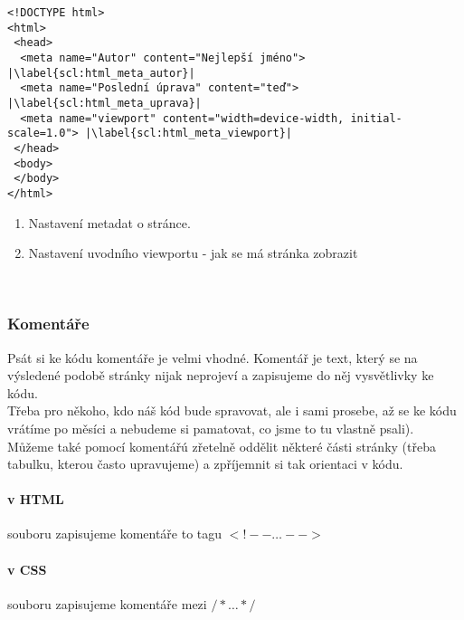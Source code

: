 \begin{minipage}[t]{.45\textwidth}
\begin{code}
\begin{verbatim}
<!DOCTYPE html> 
<html> 
 <head> 
  <meta name="Autor" content="Nejlepší jméno"> |\label{scl:html_meta_autor}|
  <meta name="Poslední úprava" content="teď"> |\label{scl:html_meta_uprava}|
  <meta name="viewport" content="width=device-width, initial-scale=1.0"> |\label{scl:html_meta_viewport}|
 </head>
 <body>
 </body> 
</html>  
\end{verbatim}

\label{code:html_meta}
\end{code}
\end{minipage}
\begin{minipage}[t]{.45\textwidth}
\begin{enumerate}
\item[ř. \ref{scl:html_meta_autor}, \ref{scl:html_meta_uprava}:] Nastavení metadat o stránce.
\item[ř. \ref{scl:html_meta_viewport}:] Nastavení uvodního viewportu - jak se má stránka zobrazit

\end{enumerate}
\end{minipage}\\


\subsubsection{Komentáře}
Psát si ke kódu komentáře je velmi vhodné. Komentář je text, který se na výsledené podobě stránky nijak neprojeví a zapisujeme do něj vysvětlivky ke kódu.\\
Třeba pro někoho, kdo náš kód bude spravovat, ale i sami prosebe, až se ke kódu vrátíme po měsíci a nebudeme si pamatovat, co jsme to tu vlastně psali). Můžeme také pomocí komentářú zřetelně oddělit některé části stránky (třeba tabulku, kterou často upravujeme) a zpříjemnit si tak orientaci v kódu.\\
\paragraph{v HTML} souboru zapisujeme komentáře to tagu $ <!-- \dots --> $
\paragraph{v CSS} souboru zapisujeme komentáře mezi $ /* \dots */ $
 